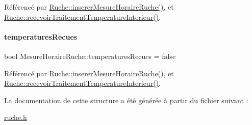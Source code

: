 Référencé par \hyperlink{class_ruche_a3a093c088d9c97f347394c8a681f7302}{Ruche\+::inserer\+Mesure\+Horaire\+Ruche()}, et \hyperlink{class_ruche_a2d2a681916140b977d45423d0d5d7b34}{Ruche\+::recevoir\+Traitement\+Temperature\+Interieur()}.

\mbox{\label{struct_mesure_horaire_ruche_ade9984cb0f2c62b3ba1369f77249bb4a}} 
\paragraph{\texorpdfstring{temperatures\+Recues}{temperaturesRecues}}
{\footnotesize\ttfamily bool Mesure\+Horaire\+Ruche\+::temperatures\+Recues = false}



Référencé par \hyperlink{class_ruche_a3a093c088d9c97f347394c8a681f7302}{Ruche\+::inserer\+Mesure\+Horaire\+Ruche()}, et \hyperlink{class_ruche_a2d2a681916140b977d45423d0d5d7b34}{Ruche\+::recevoir\+Traitement\+Temperature\+Interieur()}.



La documentation de cette structure a été générée à partir du fichier suivant \+:\begin{DoxyCompactItemize}
\item 
\hyperlink{ruche_8h}{ruche.\+h}\end{DoxyCompactItemize}
